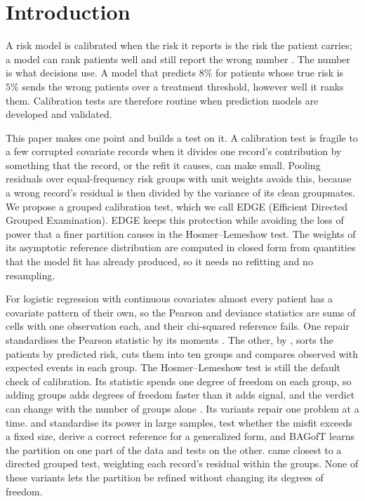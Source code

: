 \section{Introduction}\label{sec:intro}

A risk model is calibrated when the risk it reports is the risk the patient carries; a model can rank
patients well and still report the wrong number \citep{vancalster2016hierarchy}. The number is what
decisions use. A model that predicts $8\%$ for patients whose true risk is $5\%$ sends the wrong
patients over a treatment threshold, however well it ranks them. Calibration tests are therefore routine
when prediction models are developed and validated.

This paper makes one point and builds a test on it. A calibration test is fragile to a few corrupted
covariate records when it divides one record's contribution by something that the record, or the
refit it causes, can make small. Pooling residuals over equal-frequency risk groups with unit weights
avoids this, because a wrong record's residual is then divided by the variance of its clean
groupmates. We propose a grouped calibration test, which we call EDGE (Efficient Directed Grouped
Examination). EDGE keeps this protection while avoiding the loss of power that a finer partition
causes in the Hosmer--Lemeshow test. The weights of its asymptotic reference distribution are computed
in closed form from quantities that the model fit has already produced, so it needs no refitting and
no resampling.

For logistic regression with continuous covariates almost every patient has a covariate pattern of
their own, so the Pearson and deviance statistics are sums of cells with one observation each, and
their chi-squared reference fails. One repair standardises the Pearson statistic by its moments
\citep{mccullagh1985,osius1992normal}. The other, by \citet{hosmer1980goodness}, sorts the patients by
predicted risk, cuts them into ten groups and compares observed with expected events in each group.
The Hosmer--Lemeshow test is still the default check of calibration. Its statistic spends one degree
of freedom on each group, so adding groups adds degrees of freedom faster than it adds signal, and the
verdict can change with the number of groups alone \citep{paul2013power}. Its variants repair one
problem at a time. \citet{paul2013power} and \citet{Lai2018} standardise its power in large samples,
\citet{nattino2020assessing} test whether the misfit exceeds a fixed size,
\citet{surjanovic2024generalized} derive a correct reference for a generalized form, and BAGofT
\citep{BAGofT2019} learns the partition on one part of the data and tests on the other.
\citet{hosmer2002goodness} came closest to a directed grouped test, weighting each record's residual
within the groups. None of these variants lets the partition be refined without changing its degrees
of freedom.

